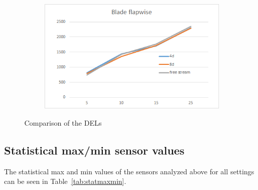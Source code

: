 \documentclass[10pt]{article}
\begin{document}
\begin{figure}[H]
\begin{subfigure}{0.40\textwidth}
\end{subfigure}
\begin{subfigure}{0.40\textwidth}
  \includegraphics[width=1\linewidth]{figures/delsBldFlap.png}
\end{subfigure}
\caption{Comparison of the DELs}
\label{fig:compDels}
\end{figure}


\subsection{Statistical max/min sensor values}
The statistical max and min values of the sensors analyzed above for all settings can be seen in Table~\ref{tab:statmaxmin}.
\end{document}
